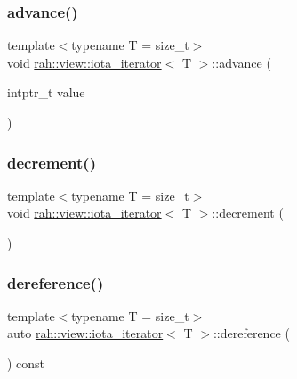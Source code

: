 \subsubsection{\texorpdfstring{advance()}{advance()}}
{\footnotesize\ttfamily template$<$typename T  = size\+\_\+t$>$ \\
void \mbox{\hyperlink{structrah_1_1view_1_1iota__iterator}{rah\+::view\+::iota\+\_\+iterator}}$<$ T $>$\+::advance (\begin{DoxyParamCaption}\item[{intptr\+\_\+t}]{value }\end{DoxyParamCaption})\hspace{0.3cm}{\ttfamily [inline]}}

\mbox{\label{structrah_1_1view_1_1iota__iterator_ab11421ab7ec8d986bdf7ef5f930d0b43}} 
\subsubsection{\texorpdfstring{decrement()}{decrement()}}
{\footnotesize\ttfamily template$<$typename T  = size\+\_\+t$>$ \\
void \mbox{\hyperlink{structrah_1_1view_1_1iota__iterator}{rah\+::view\+::iota\+\_\+iterator}}$<$ T $>$\+::decrement (\begin{DoxyParamCaption}{ }\end{DoxyParamCaption})\hspace{0.3cm}{\ttfamily [inline]}}

\mbox{\label{structrah_1_1view_1_1iota__iterator_ae31c733c52f77c7c199802db6638541d}} 
\subsubsection{\texorpdfstring{dereference()}{dereference()}}
{\footnotesize\ttfamily template$<$typename T  = size\+\_\+t$>$ \\
auto \mbox{\hyperlink{structrah_1_1view_1_1iota__iterator}{rah\+::view\+::iota\+\_\+iterator}}$<$ T $>$\+::dereference (\begin{DoxyParamCaption}{ }\end{DoxyParamCaption}) const\hspace{0.3cm}{\ttfamily [inline]}}


